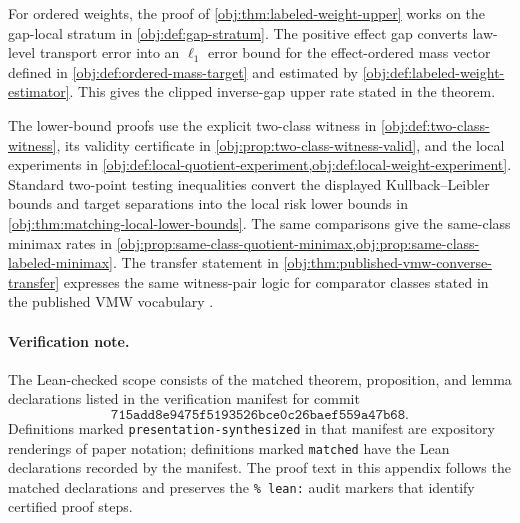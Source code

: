 For ordered weights, the proof of \cref{obj:thm:labeled-weight-upper} works on the gap-local stratum in \cref{obj:def:gap-stratum}. The positive effect gap converts law-level transport error into an \(\ell_1\) error bound for the effect-ordered mass vector defined in \cref{obj:def:ordered-mass-target} and estimated by \cref{obj:def:labeled-weight-estimator}. This gives the clipped inverse-gap upper rate stated in the theorem.

The lower-bound proofs use the explicit two-class witness in \cref{obj:def:two-class-witness}, its validity certificate in \cref{obj:prop:two-class-witness-valid}, and the local experiments in \cref{obj:def:local-quotient-experiment,obj:def:local-weight-experiment}. Standard two-point testing inequalities \citep{LeCam1986,PolyanskiyWu2019} convert the displayed Kullback--Leibler bounds and target separations into the local risk lower bounds in \cref{obj:thm:matching-local-lower-bounds}. The same comparisons give the same-class minimax rates in \cref{obj:prop:same-class-quotient-minimax,obj:prop:same-class-labeled-minimax}. The transfer statement in \cref{obj:thm:published-vmw-converse-transfer} expresses the same witness-pair logic for comparator classes stated in the published VMW vocabulary \citep{VirkMazaheriWu2026}.

\paragraph{Verification note.}
The Lean-checked scope consists of the matched theorem, proposition, and lemma declarations listed in the verification manifest for commit
\[
\texttt{715add8e9475f5193526bce0c26baef559a47b68}.
\]
Definitions marked \texttt{presentation-synthesized} in that manifest are expository renderings of paper notation; definitions marked \texttt{matched} have the Lean declarations recorded by the manifest. The proof text in this appendix follows the matched declarations and preserves the \texttt{\% lean:} audit markers that identify certified proof steps.

